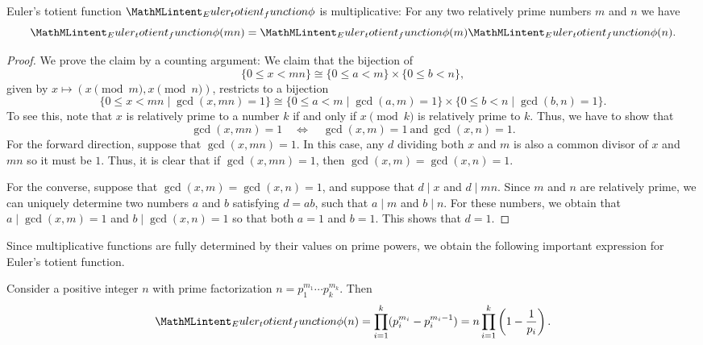 \begin{theorem}\label{theorem:multiplicative-totient}
  Euler's totient function $\totient$ is multiplicative: For any two relatively prime numbers $m$ and $n$ we have
  \begin{equation*}
    \totient(mn)=\totient(m)\totient(n).
  \end{equation*}
\end{theorem}

\begin{proof}
  We prove the claim by a counting argument: We claim that the bijection of 
  \begin{equation*}
    \{0\leq x<mn\}\cong
    \{0\leq a<m\}\times
    \{0\leq b<n\},
  \end{equation*}
  given by $x\mapsto(x\pmod{m},x\pmod{n})$, restricts to a bijection
  \begin{equation*}
    \{0\leq x<mn\mid\gcd(x,mn)=1\} \cong
    \{0\leq a<m\mid\gcd(a,m)=1\}\times
    \{0\leq b<n\mid\gcd(b,n)=1\}.
  \end{equation*}
  To see this, note that $x$ is relatively prime to a number $k$ if and only if $x\pmod{k}$ is relatively prime to $k$. Thus, we have to show that
  \begin{equation*}
    \gcd(x,mn)=1\quad\Leftrightarrow\quad\gcd(x,m)=1~\text{and}~\gcd(x,n)=1.
  \end{equation*}
  For the forward direction, suppose that $\gcd(x,mn)=1$. In this case, any $d$ dividing both $x$ and $m$ is also a common divisor of $x$ and $mn$ so it must be $1$. Thus, it is clear that if $\gcd(x,mn)=1$, then $\gcd(x,m)=\gcd(x,n)=1$.

  For the converse, suppose that $\gcd(x,m)=\gcd(x,n)=1$, and suppose that $d\mid x$ and $d\mid mn$. Since $m$ and $n$ are relatively prime, we can uniquely determine two numbers $a$ and $b$ satisfying $d=ab$, such that $a\mid m$ and $b\mid n$. For these numbers, we obtain that $a\mid\gcd(x,m)=1$ and $b\mid\gcd(x,n)=1$ so that both $a=1$ and $b=1$. This shows that $d=1$. 
\end{proof}

Since multiplicative functions are fully determined by their values on prime powers, we obtain the following important expression for Euler's totient function.

\begin{theorem}\label{theorem:product-formula-totient}
  Consider a positive integer $n$ with prime factorization $n=p_1^{m_1}\cdots p_k^{m_k}$. Then
  \begin{equation*}
    \totient(n)=\prod_{i=1}^k(p_i^{m_i}-p_i^{m_i-1})=n\prod_{i=1}^k\left(1-\frac{1}{p_i}\right).
  \end{equation*}
\end{theorem}

